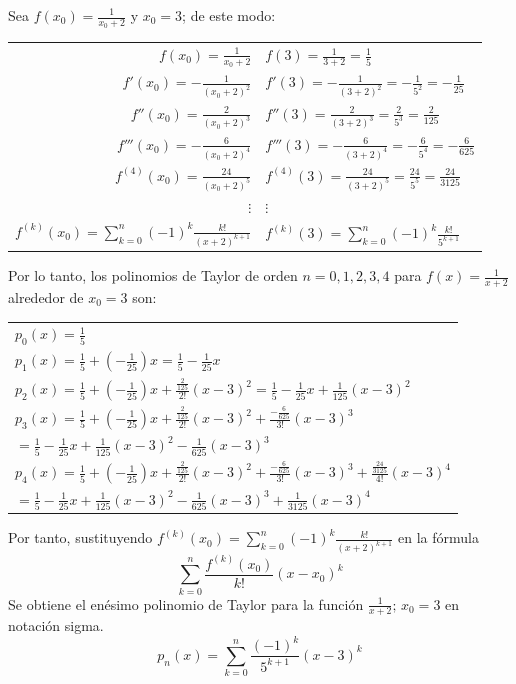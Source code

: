 \documentclass[12pt]{article}
\begin{document}
Sea $f(x_0)=\frac{1}{x_0+2}$ y $x_0=3$; de este modo:
\begin{center}
  \begin{tabular}{r l}
    $f(x_0)=\frac{1}{x_0+2}$ & $f(3)=\frac{1}{3+2}=\frac{1}{5}$\\
    $f'(x_0)=-\frac{1}{(x_0+2)^2}$ & $f'(3)=-\frac{1}{(3+2)^2}=-\frac{1}{5^2}=-\frac{1}{25}$\\
    $f''(x_0)=\frac{2}{(x_0+2)^3}$ & $f''(3)=\frac{2}{(3+2)^3}=\frac{2}{5^3}=\frac{2}{125}$\\
    $f'''(x_0)=-\frac{6}{(x_0+2)^4}$ & $f'''(3)=-\frac{6}{(3+2)^4}=-\frac{6}{5^4}=-\frac{6}{625}$ \\
    $f^{(4)}(x_0)=\frac{24}{(x_0+2)^5}$ & $f^{(4)}(3)=\frac{24}{(3+2)^5}=\frac{24}{5^5}=\frac{24}{3125}$ \\
    $\vdots$ & $\vdots$ \\
    $f^{(k)}(x_0)=\sum_{k=0}^{n} (-1)^k \frac{k!}{(x+2)^{k+1}}$ & $f^{(k)}(3)=\sum_{k=0}^{n} (-1)^k \frac{k!}{5^{k+1}}$ \\
  \end{tabular}
\end{center}
Por lo tanto, los polinomios de Taylor de orden $n = 0, 1, 2, 3, 4$ para $f(x)=\frac{1}{x+2}$ alrededor de $x_0 = 3$ son:
\begin{center}
  \begin{tabular}{l}
    $p_0(x)=\frac{1}{5}$ \\
    $p_1(x)=\frac{1}{5}+(-\frac{1}{25})x=\frac{1}{5}-\frac{1}{25}x$ \\
    $p_2(x)=\frac{1}{5}+(-\frac{1}{25})x+\frac{\frac{2}{125}}{2!}(x-3)^2=\frac{1}{5}-\frac{1}{25}x+\frac{1}{125}(x-3)^2$ \\
    $p_3(x)=\frac{1}{5}+(-\frac{1}{25})x+\frac{\frac{2}{125}}{2!}(x-3)^2+\frac{-\frac{6}{625}}{3!}(x-3)^3$ \\
    $=\frac{1}{5}-\frac{1}{25}x+\frac{1}{125}(x-3)^2-\frac{1}{625}(x-3)^3$ \\
    $p_4(x)=\frac{1}{5}+(-\frac{1}{25})x+\frac{\frac{2}{125}}{2!}(x-3)^2+\frac{-\frac{6}{625}}{3!}(x-3)^3+\frac{\frac{24}{3125}}{4!}(x-3)^4$ \\
    $=\frac{1}{5}-\frac{1}{25}x+\frac{1}{125}(x-3)^2-\frac{1}{625}(x-3)^3+\frac{1}{3125}(x-3)^4$ \\
  \end{tabular}
\end{center}
Por tanto, sustituyendo $f^{(k)}(x_0)=\sum_{k=0}^{n} (-1)^k \frac{k!}{(x+2)^{k+1}}$ en la fórmula
\[ \sum_{k=0}^{n} \frac{f^{(k)}(x_0)}{k!}(x-x_0)^k \]
Se obtiene el enésimo polinomio de Taylor para la función $\frac{1}{x+2} \text{; } x_0=3$ en notación sigma.
\[
p_n(x)=\sum_{k=0}^{n} \frac{(-1)^k}{5^{k+1}}(x-3)^k
\]
\end{document}

